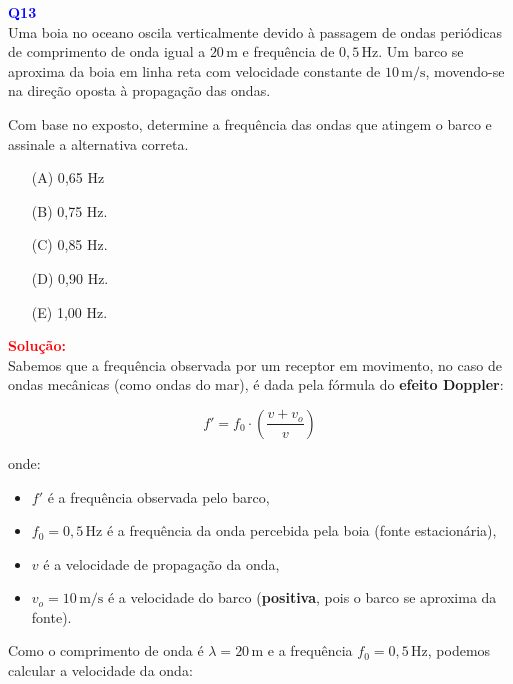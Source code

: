 \documentclass[a4paper,12pt]{article}
\begin{document}
\begin{flushleft}
\textbf{\textcolor{blue}{\Large Q13}}\\
Uma boia no oceano oscila verticalmente devido à passagem de ondas periódicas de comprimento de onda 
igual a \(20\,\text{m}\) e frequência de \(0{,}5\,\text{Hz}\). Um barco se aproxima da boia em linha 
reta com velocidade constante de \(10\,\text{m/s}\), movendo-se na direção oposta à propagação das ondas.

Com base no exposto, determine a frequência das ondas que atingem o barco e assinale a alternativa correta.

\begin{itemize}
\item[(A)] 0{,}65 Hz 
\item[(B)] 0{,}75 Hz.
\item[(C)] 0{,}85 Hz.
\item[(D)] 0{,}90 Hz.
\item[(E)] 1,00 Hz.
\end{itemize}

\vspace{0.5cm}

\textcolor{red}{\textbf{Solução:}}\\

\noindent
Sabemos que a frequência observada por um receptor em movimento, no caso de \colorbox{yellow!20}{ondas} \colorbox{yellow!20}{mecânicas (como ondas do mar), 
é dada pela fórmula do \textbf{efeito Doppler}:}

\begin{equation}
\boxed{
f' = f_0 \cdot \left( \frac{v + v_o}{v} \right)
}
\end{equation}

\noindent
onde:
\begin{itemize}
  \item \( f' \) é a frequência observada pelo barco,
  \item \( f_0 = 0{,}5\,\text{Hz} \) é a frequência da onda percebida pela boia (fonte estacionária),
  \item \( v \) é a velocidade de propagação da onda,
  \item \( v_o = 10\,\text{m/s} \) é a velocidade do barco (\textbf{positiva}, pois o barco se aproxima da fonte).
\end{itemize}

\noindent
Como o comprimento de onda é \( \lambda = 20\,\text{m} \) e a frequência \( f_0 = 0{,}5\,\text{Hz} \), podemos calcular a velocidade da onda:


\end{flushleft}
\end{document}
